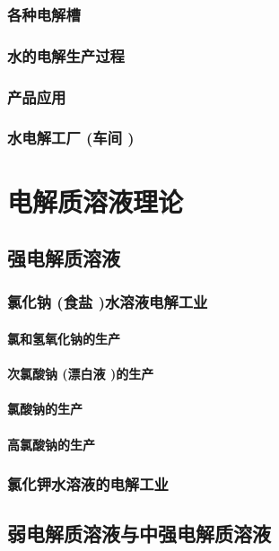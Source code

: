 \documentclass[UTF8]{../03-Chemistry}
\begin{document}
    \subsubsection{各种电解槽}
    \subsubsection{水的电解生产过程}
    \subsubsection{产品应用}
    \subsubsection{水电解工厂 (车间 )}
\section{电解质溶液理论}
    \subsection{强电解质溶液}
        \subsubsection{氯化钠 (食盐 )水溶液电解工业}
            \paragraph{氯和氢氧化钠的生产}
            \paragraph{次氯酸钠 (漂白液 )的生产}
            \paragraph{氯酸钠的生产}
            \paragraph{高氯酸钠的生产}
        \subsubsection{氯化钾水溶液的电解工业}

    \subsection{弱电解质溶液与中强电解质溶液}
\end{document}
